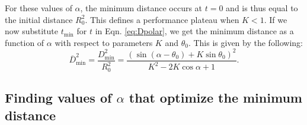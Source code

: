 \documentclass[12pt]{article}
\def\ds{\displaystyle}
\newcommand{\ol}{\overline}
\begin{document}
%
For these values of $\alpha$, the minimum distance occurs at $t=0$ and is thus equal to the initial distance $R_0^2$. 
This defines a performance plateau when $K < 1.$
If we now substitute $t_{\text{min}}$ for $t$ in Eqn. \ref{eq:Dpolar}, we get the minimum distance as a function of $\alpha$ with respect to parameters $K$ and $\theta_0$. 
This is given by the following: 
%
\begin{equation}
\ol{D}^2_{\text{min}}= \ds\frac{{D}^2_{\text{min}}}{R_0^2 }=
\ds\frac{\left ( \sin(\alpha - \theta_0) + K \sin \theta_0 \right )^2}{K^2-2 K \cos \alpha +1}. 
\label{eq:Dmin_polar}
\end{equation}
%

\newpage
\subsection{Finding values of $\alpha$ that optimize the minimum distance}
\end{document}
